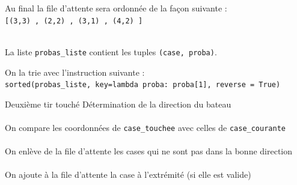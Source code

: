 \begin{frame}
\begin{center}
\end{center}
\end{frame}

\begin{frame}
Au final la file d'attente sera ordonnée de la façon suivante :\\
\texttt{[(3,3) , (2,2) , (3,1) , (4,2) ]}\\~\\  \pause

La liste \texttt{probas\_liste} contient les tuples \texttt{(case, proba)}.\\  \pause

On la trie avec l'instruction suivante :\\
\texttt{sorted(probas\_liste, key=lambda proba: proba[1], reverse = True)}
\end{frame}


\begin{frame}{Deuxième tir touché}
Détermination de la direction du bateau\\~\\  \pause
On compare les coordonnées de \texttt{case\_touchee} avec celles de \texttt{case\_courante}\\~\\ \pause
On enlève de la file d'attente les cases qui ne sont pas dans la bonne direction\\~\\ \pause
On ajoute à la file d'attente la case à l'extrémité (si elle est valide)
\end{frame}

